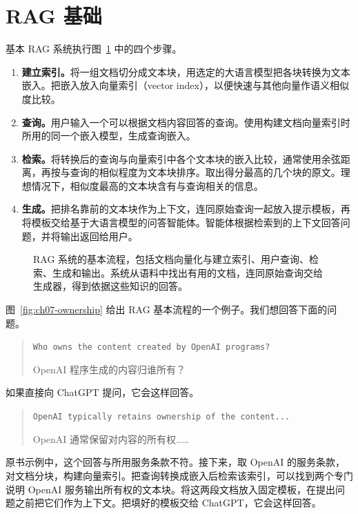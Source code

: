 \section{RAG 基础}
\label{sec:ch07-basics}
基本 RAG 系统执行图~\ref{fig:ch07-basic} 中的四个步骤。

\begin{keypoint}
\begin{enumerate}
\item \textbf{建立索引。}将一组文档切分成文本块，用选定的大语言模型把各块转换为文本嵌入。把嵌入放入向量索引（vector index），以便快速与其他向量作语义相似度比较。
\item \textbf{查询。}用户输入一个可以根据文档内容回答的查询。使用构建文档向量索引时所用的同一个嵌入模型，生成查询嵌入。
\item \textbf{检索。}将转换后的查询与向量索引中各个文本块的嵌入比较，通常使用余弦距离，再按与查询的相似程度为文本块排序。取出得分最高的几个块的原文。理想情况下，相似度最高的文本块含有与查询相关的信息。
\item \textbf{生成。}把排名靠前的文本块作为上下文，连同原始查询一起放入提示模板，再将模板交给基于大语言模型的问答智能体。智能体根据检索到的上下文回答问题，并将输出返回给用户。
\end{enumerate}
\end{keypoint}

\begin{figure}[!htbp]
\centering

\caption{RAG 系统的基本流程，包括文档向量化与建立索引、用户查询、检索、生成和输出。系统从语料中找出有用的文档，连同原始查询交给生成器，得到依据这些知识的回答。}
\label{fig:ch07-basic}
\end{figure}

图~\ref{fig:ch07-ownership} 给出 RAG 基本流程的一个例子。我们想回答下面的问题。

\begin{quote}
\texttt{Who owns the content created by OpenAI programs?}

OpenAI 程序生成的内容归谁所有？
\end{quote}

如果直接向 ChatGPT 提问，它会这样回答。

\begin{quote}
\texttt{OpenAI typically retains ownership of the content...}

OpenAI 通常保留对内容的所有权……
\end{quote}

原书示例中，这个回答与所用服务条款不符。接下来，取 OpenAI 的服务条款，对文档分块，构建向量索引。把查询转换成嵌入后检索该索引，可以找到两个专门说明 OpenAI 服务输出所有权的文本块。将这两段文档放入固定模板，在提出问题之前把它们作为上下文。把填好的模板交给 ChatGPT，它会这样回答。

